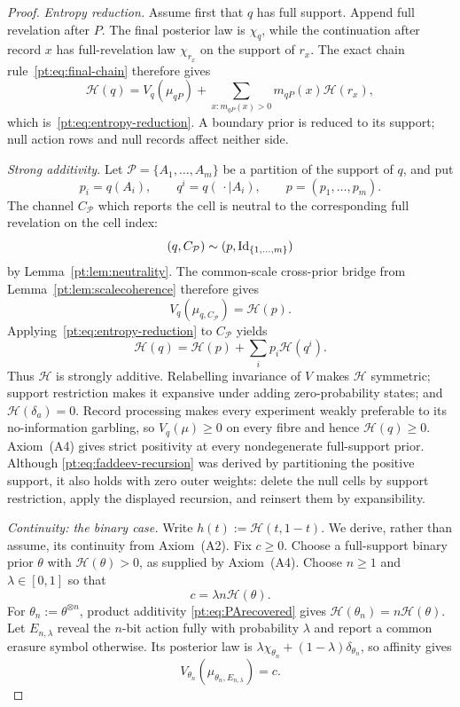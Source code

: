 \begin{proof}
\emph{Entropy reduction.}
Assume first that $q$ has full support.  Append full revelation after $P$.
The final posterior law is $\chi_q$, while the continuation after record $x$
has full-revelation law $\chi_{r_x}$ on the support of $r_x$.  The exact
chain rule~\eqref{pt:eq:final-chain} therefore gives
\[
 \mathcal H(q)=V_q(\mu_{qP})
 +\sum_{x:m_{qP}(x)>0}m_{qP}(x)\mathcal H(r_x),
\]
which is~\eqref{pt:eq:entropy-reduction}.  A boundary prior is reduced to its
support; null action rows and null records affect neither side.

\emph{Strong additivity.}
Let $\mathcal P=\{A_1,\ldots,A_m\}$ be a partition of the support of $q$,
and put
\[
 p_i=q(A_i),\qquad q^i=q(\,\cdot\mid A_i),\qquad
 p=(p_1,\ldots,p_m).
\]
The channel $C_{\mathcal P}$ which reports the cell is neutral to the
corresponding full revelation on the cell index:
\[
 (q,C_{\mathcal P})\sim(p,\operatorname{Id}_{\{1,\ldots,m\}})
\]
by Lemma~\ref{pt:lem:neutrality}.  The common-scale cross-prior bridge from
Lemma~\ref{pt:lem:scalecoherence} therefore gives
\[
 V_q(\mu_{q,C_{\mathcal P}})=\mathcal H(p).
\]
Applying~\eqref{pt:eq:entropy-reduction} to $C_{\mathcal P}$ yields
\begin{equation}
 \mathcal H(q)=\mathcal H(p)+\sum_i p_i\mathcal H(q^i).
\tag{FA}\label{pt:eq:faddeev-recursion}
\end{equation}
Thus $\mathcal H$ is strongly additive.  Relabelling invariance of $V$ makes
$\mathcal H$ symmetric; support restriction makes it expansive under adding
zero-probability states; and $\mathcal H(\delta_a)=0$.  Record processing
makes every experiment weakly preferable to its no-information garbling, so
$V_q(\mu)\ge0$ on every fibre and hence $\mathcal H(q)\ge0$.
Axiom~\textup{(A4)} gives strict
positivity at every nondegenerate full-support prior.
Although \eqref{pt:eq:faddeev-recursion} was derived by partitioning the
positive support, it also holds with zero outer weights: delete the null cells
by support restriction, apply the displayed recursion, and reinsert them by
expansibility.

\emph{Continuity: the binary case.}
Write $h(t):=\mathcal H(t,1-t)$.  We derive, rather than assume, its
continuity from Axiom~\textup{(A2)}.  Fix $c\ge0$.  Choose a full-support
binary prior $\theta$ with $\mathcal H(\theta)>0$, as supplied by
Axiom~\textup{(A4)}.  Choose $n\ge1$ and $\lambda\in[0,1]$ so that
\[
 c=\lambda n\mathcal H(\theta).
\]
For $\theta_n:=\theta^{\otimes n}$, product additivity
\eqref{pt:eq:PArecovered} gives
$\mathcal H(\theta_n)=n\mathcal H(\theta)$.  Let $E_{n,\lambda}$ reveal the
$n$-bit action fully with probability $\lambda$ and report a common erasure
symbol otherwise.  Its posterior law is
$\lambda\chi_{\theta_n}+(1-\lambda)\delta_{\theta_n}$, so affinity gives
\[
 V_{\theta_n}(\mu_{\theta_n,E_{n,\lambda}})=c.
\]


\end{proof}
